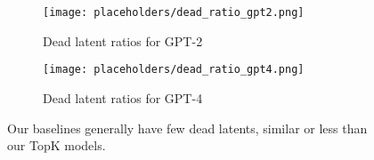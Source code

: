 \begin{figure}
    \centering
    \begin{subfigure}[b]{0.45\textwidth}
    \texttt{[image: placeholders/dead\_ratio\_gpt2.png]}%
    \caption{Dead latent ratios for GPT-2}
    \end{subfigure}
    \hspace{10pt}
    \begin{subfigure}[b]{0.45\textwidth}
    \texttt{[image: placeholders/dead\_ratio\_gpt4.png]}%
     \caption{Dead latent ratios for GPT-4}
     \end{subfigure}
     \caption{Our baselines generally have few dead latents, similar or less than our TopK models.}
    \label{fig:baselines_dead_ratio}
\end{figure}
